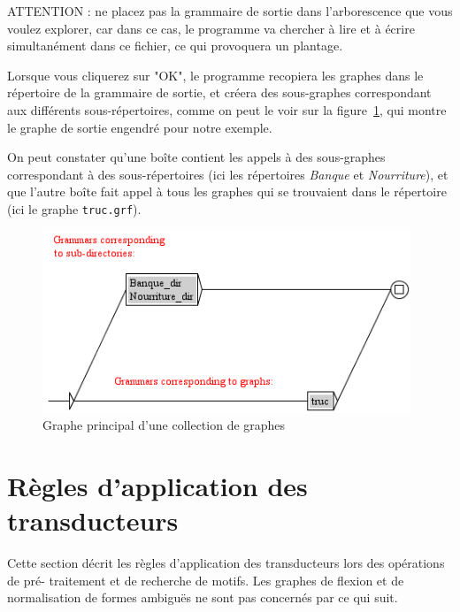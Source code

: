 \bigskip
\noindent ATTENTION : ne placez pas la grammaire de sortie dans l’arborescence que vous
voulez explorer, car dans ce cas, le programme va chercher à lire et à écrire simultanément
dans ce fichier, ce qui provoquera un plantage.


\bigskip
\noindent Lorsque vous cliquerez sur "OK", le programme recopiera les graphes dans le répertoire de
la grammaire de sortie, et créera des sous-graphes correspondant aux différents
sous-répertoires, comme on peut le voir sur la figure~\ref{fig-graph-collection}, qui montre
le graphe de sortie engendré pour notre exemple.


\bigskip
\noindent On peut constater qu’une boîte contient les appels à des
sous-graphes correspondant à des sous-répertoires (ici les répertoires \textit{Banque}
et \textit{Nourriture}), et que l’autre boîte fait appel à tous les graphes qui se trouvaient
dans le répertoire (ici le graphe \texttt{truc.grf}).

\begin{figure}[!ht]
\begin{center}
\includegraphics[width=11cm]{resources/img/fig6-21.png}
\caption{Graphe principal d’une collection de graphes\label{fig-graph-collection}}
\end{center}
\end{figure}



\section{Règles d’application des transducteurs}
\label{section-applying-transducers-rules}
Cette section décrit les règles d’application des transducteurs lors des opérations de pré-
traitement et de recherche de motifs. Les graphes de flexion et de normalisation de formes
ambiguës ne sont pas concernés par ce qui suit.



